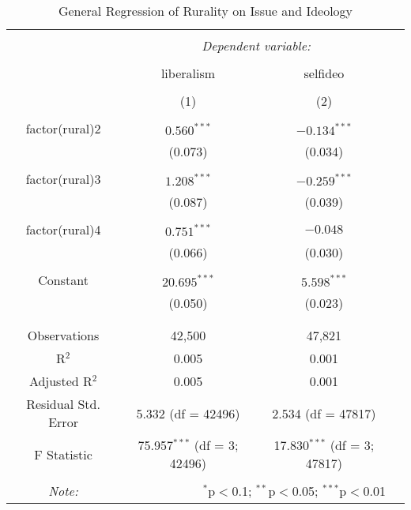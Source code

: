 \documentclass[12pt, titlepage]{article}
\begin{document}
\begin{table}[H] \centering 
	\caption{General Regression of Rurality on Issue and Ideology} 
	\label{GeneralReg} 
	\begin{tabular}{@{\extracolsep{5pt}}cccc } 
		\\[-1.8ex]\hline 
		\hline \\[-1.8ex] 
		& \multicolumn{2}{c}{\textit{Dependent variable:}} \\ 
		\cline{2-3} 
		\\[-1.8ex] & \multicolumn{1}{c}{liberalism} & \multicolumn{1}{c}{selfideo} \\ 
		\\[-1.8ex] & \multicolumn{1}{c}{(1)} & \multicolumn{1}{c}{(2)}\\ 
		\hline \\[-1.8ex] 
		factor(rural)2 & $0.560^{***}$ & $-0.134^{***}$ \\ 
		& (0.073) & (0.034) \\ 
		& & \\ 
		factor(rural)3 & $1.208^{***}$ & $-0.259^{***}$ \\ 
		& (0.087) & (0.039) \\ 
		& & \\ 
		factor(rural)4 & $0.751^{***}$ & $-0.048 $\\ 
		& (0.066) & (0.030) \\ 
		& & \\ 
		Constant & $20.695^{***}$ & $5.598^{***}$ \\ 
		& (0.050) & (0.023) \\ 
		& & \\ 
		\hline \\[-1.8ex] 
		Observations & \multicolumn{1}{c}{42,500} & \multicolumn{1}{c}{47,821} \\ 
		R$^{2}$ & \multicolumn{1}{c}{0.005} & \multicolumn{1}{c}{0.001} \\ 
		Adjusted R$^{2}$ & \multicolumn{1}{c}{0.005} & \multicolumn{1}{c}{0.001} \\ 
		Residual Std. Error & \multicolumn{1}{c}{5.332 (df = 42496)} & \multicolumn{1}{c}{2.534 (df = 47817)} \\ 
		F Statistic & \multicolumn{1}{c}{75.957$^{***}$ (df = 3; 42496)} & \multicolumn{1}{c}{17.830$^{***}$ (df = 3; 47817)} \\ 
		\hline 
		\hline \\[-1.8ex] 
		\textit{Note:}  & \multicolumn{2}{r}{$^{*}$p$<$0.1; $^{**}$p$<$0.05; $^{***}$p$<$0.01} \\ 
	\end{tabular} 
\end{table} 
\end{document}
